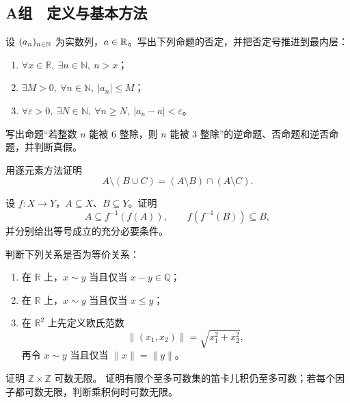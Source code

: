 \subsection*{A组　定义与基本方法}
\begin{enumerate}[label=\textbf{\thechapter.\arabic*.}]
   设 \((a_n)_{n\in\mathbb{N}}\) 为实数列，\(a\in\mathbb{R}\)。写出下列命题的否定，并把否定号推进到最内层：
  \begin{enumerate}[label=(\arabic*)]
    \item \(\forall x\in\mathbb R,\ \exists n\in\mathbb N,\ n>x\)；
    \item \(\exists M>0,\ \forall n\in\mathbb N,\ |a_n|\le M\)；
    \item \(\forall\varepsilon>0,\ \exists N\in\mathbb N,\ \forall n\ge N,\ |a_n-a|<\varepsilon\)。
  \end{enumerate}

   写出命题“若整数 \(n\) 能被 \(6\) 整除，则 \(n\) 能被 \(3\) 整除”的逆命题、否命题和逆否命题，并判断真假。

   用逐元素方法证明
  \[
    A\setminus(B\cup C)=(A\setminus B)\cap(A\setminus C).
  \]

   设 \(f:X\to Y\)，\(A\subseteq X\)、\(B\subseteq Y\)。证明
  \[
    A\subseteq f^{-1}(f(A)),\qquad f(f^{-1}(B))\subseteq B,
  \]
  并分别给出等号成立的充分必要条件。

   判断下列关系是否为等价关系：
  \begin{enumerate}[label=(\arabic*)]
    \item 在 \(\mathbb R\) 上，\(x\sim y\) 当且仅当 \(x-y\in\mathbb Q\)；
    \item 在 \(\mathbb R\) 上，\(x\sim y\) 当且仅当 \(x\le y\)；
    \item 在 \(\mathbb R^2\) 上先定义欧氏范数
    \[
      \|(x_1,x_2)\|=\sqrt{x_1^2+x_2^2},
    \]
    再令 \(x\sim y\) 当且仅当 \(\|x\|=\|y\|\)。
  \end{enumerate}

   证明 \(\mathbb Z\times\mathbb Z\) 可数无限。
   证明有限个至多可数集的笛卡儿积仍至多可数；若每个因子都可数无限，判断乘积何时可数无限。
\end{enumerate}

